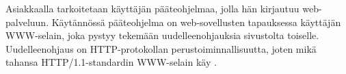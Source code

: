 Asiakkaalla tarkoitetaan käyttäjän pääteohjelmaa, jolla hän kirjautuu web-palveluun. Käytännössä pääteohjelma on web-sovellusten tapauksessa käyttäjän WWW-selain, joka pystyy tekemään uudelleenohjauksia sivustolta toiselle. Uudelleenohjaus on HTTP-protokollan perustoiminnallisuutta, joten mikä tahansa HTTP/1.1-standardin WWW-selain käy \cite{rfc2616}.